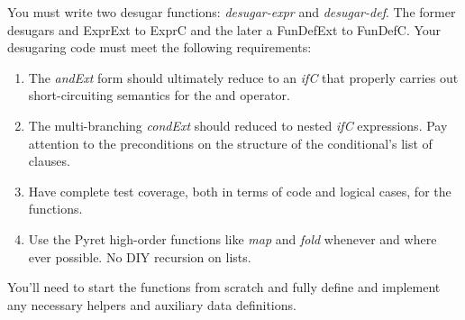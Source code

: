 \documentclass[10pt]{article}
\begin{document}
You must write two desugar functions: \textit{desugar-expr} and \textit{desugar-def}. The former desugars and ExprExt to ExprC and the later a FunDefExt to FunDefC. Your desugaring code must meet the following requirements:
\begin{enumerate}
\item The \textit{andExt} form should ultimately reduce to an \textit{ifC} that properly carries out short-circuiting semantics for the and operator.
\item The multi-branching \textit{condExt} should reduced to nested \textit{ifC} expressions. Pay attention to the preconditions on the structure of the conditional's list of clauses. 
\item Have complete test coverage, both in terms of code and logical cases, for the functions.
\item Use the Pyret high-order functions like \textit{map} and \textit{fold} whenever and where ever possible. No DIY recursion on lists.
\end{enumerate}
You'll need to start the functions from scratch and fully define and implement any necessary helpers and auxiliary data definitions.
\end{document}
